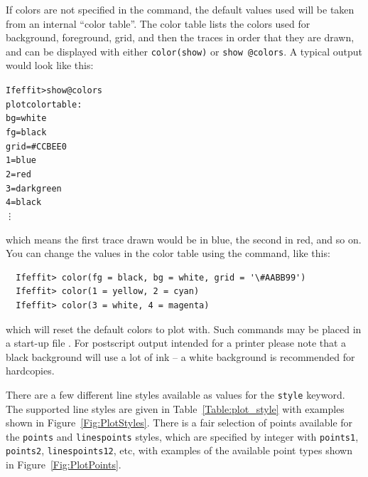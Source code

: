 {} If colors are not specified in the
{} command, the default values used will be taken from an
internal ``color table''. The color table lists the colors used for
background, foreground, grid, and then the traces in order that they are
drawn, and can be displayed with either {\texttt{color(show)}} or
{\texttt{show @colors}}.  A typical output would look like this:
\begin{alltt}
  Ifeffit> show @colors
  plot color table:
     bg   = white
     fg   = black
     grid = #CCBEE0
        1 = blue
        2 = red
        3 = darkgreen
        4 = black
   \vdots
\end{alltt}
\noindent
which means the first trace drawn would be in blue, the second in red, and
so on.   You can change the values in the color table using the
{} command, like this:
\begin{verbatim}
  Ifeffit> color(fg = black, bg = white, grid = '\#AABB99')
  Ifeffit> color(1 = yellow, 2 = cyan)
  Ifeffit> color(3 = white, 4 = magenta)
\end{verbatim}
\noindent
which will reset the default colors to plot with.  Such commands may be
placed in a start-up file {}.  For postscript output
intended for a printer please note that a black background will use a lot
of ink --  a white background is recommended for hardcopies.

There are a few different line styles available as values for the
{\texttt{style}} keyword.  The supported line styles are given in
Table~\ref{Table:plot_style} with examples shown in
Figure~\ref{Fig:PlotStyles}.  There is a fair selection of points available
for the {\tt{points}} and {\tt{linespoints}} styles, which are specified by
integer with {\texttt{points1}}, {\texttt{points2}},
{\texttt{linespoints12}}, etc, with examples of the available point types
shown in Figure~\ref{Fig:PlotPoints}.  {}
{}

